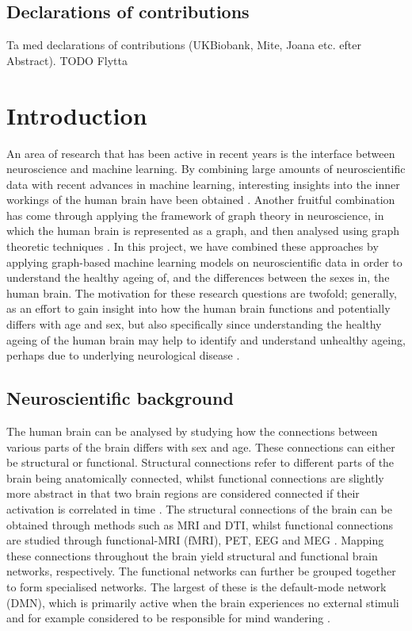 \section{Declarations of contributions}
Ta med declarations of contributions (UKBiobank, Mite, Joana etc. efter Abstract).
TODO Flytta

\chapter{Introduction}

An area of research that has been active in recent years is the interface between neuroscience and machine learning. By combining large amounts of neuroscientific data with recent advances in machine learning, interesting insights into the inner workings of the human brain have been obtained \cite{neuro_ml, amoroso_multiplex_age, amoroso_multiplex_ad}. Another fruitful combination has come through applying the framework of graph theory in neuroscience, in which the human brain is represented as a graph, and then analysed using graph theoretic techniques \cite{chan, braph}. In this project, we have combined these approaches by applying graph-based machine learning models on neuroscientific data in order to understand the healthy ageing of, and the differences between the sexes in, the human brain. The motivation for these research questions are twofold; generally, as an effort to gain insight into how the human brain functions and potentially differs with age and sex, but also specifically since understanding the healthy ageing of the human brain may help to identify and understand unhealthy ageing, perhaps due to underlying neurological disease \cite{kaufmann}. 


\section{Neuroscientific background}

The human brain can be analysed by studying how the connections between various parts of the brain differs with sex and age. These connections can either be structural or functional. Structural connections refer to different parts of the brain being anatomically connected, whilst functional connections are slightly more abstract in that two brain regions are considered connected if their activation is correlated in time \cite{sporns}. The structural connections of the brain can be obtained through methods such as MRI and DTI, whilst functional connections are studied through functional-MRI (fMRI), PET, EEG and MEG \cite{hirsch}. Mapping these connections throughout the brain yield structural and functional brain networks, respectively. The functional networks can further be grouped together to form specialised networks. The largest of these is the default-mode network (DMN), which is primarily active when the brain experiences no external stimuli and for example considered to be responsible for mind wandering \cite{alves_dmn}.


